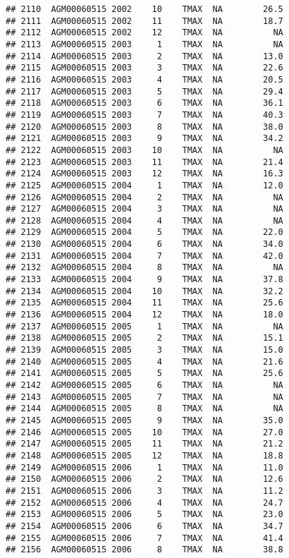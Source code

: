 \documentclass{article}\usepackage[]{graphicx}\usepackage[]{color}
\makeatletter
\newenvironment{kframe}{%
 \def\at@end@of@kframe{}%
 \ifinner\ifhmode%
  \def\at@end@of@kframe{\end{minipage}}%
  \begin{minipage}{\columnwidth}%
 \fi\fi%
 \def\FrameCommand##1{\hskip\@totalleftmargin \hskip-\fboxsep
 \colorbox{shadecolor}{##1}\hskip-\fboxsep
     \hskip-\linewidth \hskip-\@totalleftmargin \hskip\columnwidth}%
 \MakeFramed {\advance\hsize-\width
   \@totalleftmargin\z@ \linewidth\hsize
   \@setminipage}}%
 {\par\unskip\endMakeFramed%
 \at@end@of@kframe}
\newenvironment{knitrout}{}{} %
\makeatother
\begin{document}
\begin{knitrout}
\begin{kframe}
\begin{verbatim}
## 2110  AGM00060515 2002    10    TMAX  NA        26.5
## 2111  AGM00060515 2002    11    TMAX  NA        18.7
## 2112  AGM00060515 2002    12    TMAX  NA          NA
## 2113  AGM00060515 2003     1    TMAX  NA          NA
## 2114  AGM00060515 2003     2    TMAX  NA        13.0
## 2115  AGM00060515 2003     3    TMAX  NA        22.6
## 2116  AGM00060515 2003     4    TMAX  NA        20.5
## 2117  AGM00060515 2003     5    TMAX  NA        29.4
## 2118  AGM00060515 2003     6    TMAX  NA        36.1
## 2119  AGM00060515 2003     7    TMAX  NA        40.3
## 2120  AGM00060515 2003     8    TMAX  NA        38.0
## 2121  AGM00060515 2003     9    TMAX  NA        34.2
## 2122  AGM00060515 2003    10    TMAX  NA          NA
## 2123  AGM00060515 2003    11    TMAX  NA        21.4
## 2124  AGM00060515 2003    12    TMAX  NA        16.3
## 2125  AGM00060515 2004     1    TMAX  NA        12.0
## 2126  AGM00060515 2004     2    TMAX  NA          NA
## 2127  AGM00060515 2004     3    TMAX  NA          NA
## 2128  AGM00060515 2004     4    TMAX  NA          NA
## 2129  AGM00060515 2004     5    TMAX  NA        22.0
## 2130  AGM00060515 2004     6    TMAX  NA        34.0
## 2131  AGM00060515 2004     7    TMAX  NA        42.0
## 2132  AGM00060515 2004     8    TMAX  NA          NA
## 2133  AGM00060515 2004     9    TMAX  NA        37.8
## 2134  AGM00060515 2004    10    TMAX  NA        32.2
## 2135  AGM00060515 2004    11    TMAX  NA        25.6
## 2136  AGM00060515 2004    12    TMAX  NA        18.0
## 2137  AGM00060515 2005     1    TMAX  NA          NA
## 2138  AGM00060515 2005     2    TMAX  NA        15.1
## 2139  AGM00060515 2005     3    TMAX  NA        15.0
## 2140  AGM00060515 2005     4    TMAX  NA        21.6
## 2141  AGM00060515 2005     5    TMAX  NA        25.6
## 2142  AGM00060515 2005     6    TMAX  NA          NA
## 2143  AGM00060515 2005     7    TMAX  NA          NA
## 2144  AGM00060515 2005     8    TMAX  NA          NA
## 2145  AGM00060515 2005     9    TMAX  NA        35.0
## 2146  AGM00060515 2005    10    TMAX  NA        27.0
## 2147  AGM00060515 2005    11    TMAX  NA        21.2
## 2148  AGM00060515 2005    12    TMAX  NA        18.8
## 2149  AGM00060515 2006     1    TMAX  NA        11.0
## 2150  AGM00060515 2006     2    TMAX  NA        12.6
## 2151  AGM00060515 2006     3    TMAX  NA        11.2
## 2152  AGM00060515 2006     4    TMAX  NA        24.7
## 2153  AGM00060515 2006     5    TMAX  NA        23.0
## 2154  AGM00060515 2006     6    TMAX  NA        34.7
## 2155  AGM00060515 2006     7    TMAX  NA        41.4
## 2156  AGM00060515 2006     8    TMAX  NA        38.8

\end{verbatim}
\end{kframe}
\end{knitrout}
\end{document}
